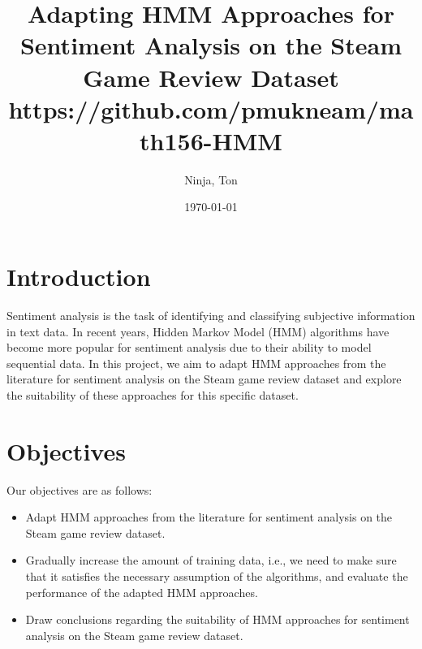 \documentclass{article}
\title{Adapting HMM Approaches for Sentiment Analysis on the Steam Game Review Dataset \\ \small https://github.com/pmukneam/math156-HMM}
\author{Ninja, Ton}
\date{\today}
\begin{document}
\maketitle

\section{Introduction}
Sentiment analysis is the task of identifying and classifying subjective information in text data. In recent years, Hidden Markov Model (HMM) algorithms have become more popular for sentiment analysis due to their ability to model sequential data. In this project, we aim to adapt HMM approaches from the literature for sentiment analysis on the Steam game review dataset and explore the suitability of these approaches for this specific dataset.

\section{Objectives}
Our objectives are as follows:
\begin{itemize}
\item Adapt HMM approaches from the literature for sentiment analysis on the Steam game review dataset.
\item Gradually increase the amount of training data, i.e., we need to make sure that it satisfies the necessary assumption of the algorithms, and evaluate the performance of the adapted HMM approaches.
\item Draw conclusions regarding the suitability of HMM approaches for sentiment analysis on the Steam game review dataset.
\end{itemize}
\end{document}
